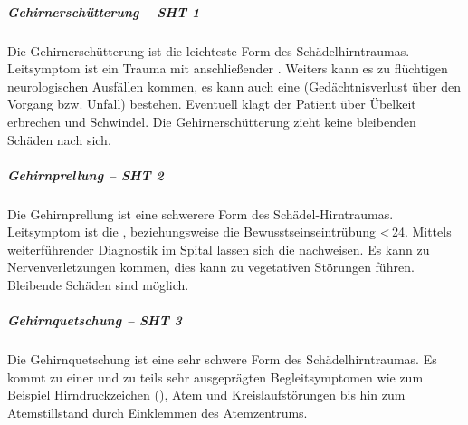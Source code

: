 % 
{}
{%
\subparagraph{Gehirnerschütterung -- SHT 1\textdegree}

 

Die Gehirnerschütterung ist die leichteste Form des
Schädelhirntraumas. Leitsymptom ist ein Trauma mit
anschließender . Weiters kann es
zu flüchtigen neurologischen Ausfällen kommen, es kann auch eine
(Gedächtnisverlust über den Vorgang bzw. Unfall) bestehen.
Eventuell klagt der Patient über
Übelkeit erbrechen und Schwindel. Die Gehirnerschütterung
zieht keine bleibenden Schäden nach sich.

\subparagraph{Gehirnprellung -- SHT 2\textdegree}

 

Die Gehirnprellung ist eine schwerere Form des
Schädel-Hirntraumas. Leitsymptom ist die
, beziehungsweise die Bewusstseinseintrübung
 <\,24\Hour*. Mittels weiterführender Diagnostik im Spital
 lassen sich die  nachweisen. Es kann
 zu Nervenverletzungen kommen, dies kann zu vegetativen
 Störungen führen. Bleibende Schäden sind möglich.

\subparagraph{Gehirnquetschung -- SHT 3{\textdegree}}
%
\label{topic:hirnblutung}%

Die Gehirnquetschung ist eine sehr schwere Form des
Schädelhirntraumas. Es kommt zu einer  und zu teils sehr ausgeprägten
Begleitsymptomen wie zum Beispiel Hirndruckzeichen
(), Atem und
Kreislaufstörungen bis hin zum Atemstillstand durch
Einklemmen des Atemzentrums.

}
